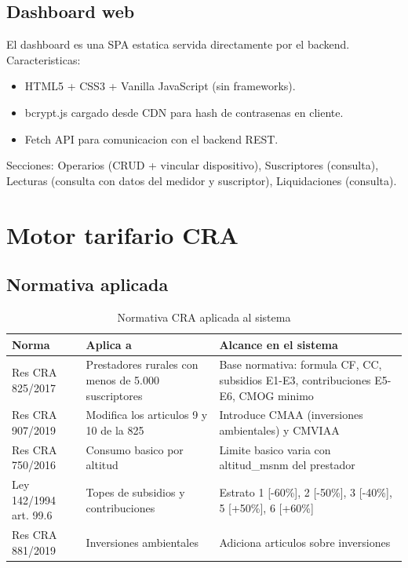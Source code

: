 \documentclass[11pt,a4paper,oneside]{report}
\begin{document}
\section{Dashboard web}

El dashboard es una SPA estatica servida directamente por el backend. Caracteristicas:

\begin{itemize}[leftmargin=*]
    \item HTML5 + CSS3 + Vanilla JavaScript (sin frameworks).
    \item bcrypt.js cargado desde CDN para hash de contrasenas en cliente.
    \item Fetch API para comunicacion con el backend REST.
\end{itemize}

Secciones: Operarios (CRUD + vincular dispositivo), Suscriptores (consulta), Lecturas (consulta con datos del medidor y suscriptor), Liquidaciones (consulta).


\chapter{Motor tarifario CRA}

\section{Normativa aplicada}

\begin{table}[h]
\centering
\caption{Normativa CRA aplicada al sistema}
\begin{tabularx}{\textwidth}{L{3cm} L{3.5cm} X}
\toprule
\textbf{Norma} & \textbf{Aplica a} & \textbf{Alcance en el sistema} \\
\midrule
Res CRA 825/2017 & Prestadores rurales con menos de 5.000 suscriptores & Base normativa: formula CF, CC, subsidios E1-E3, contribuciones E5-E6, CMOG minimo \\
Res CRA 907/2019 & Modifica los articulos 9 y 10 de la 825 & Introduce CMAA (inversiones ambientales) y CMVIAA \\
Res CRA 750/2016 & Consumo basico por altitud & Limite basico varia con altitud\_msnm del prestador \\
Ley 142/1994 art. 99.6 & Topes de subsidios y contribuciones & Estrato 1 [-60\%], 2 [-50\%], 3 [-40\%], 5 [+50\%], 6 [+60\%] \\
Res CRA 881/2019 & Inversiones ambientales & Adiciona articulos sobre inversiones \\
\bottomrule
\end{tabularx}
\end{table}
\end{document}

